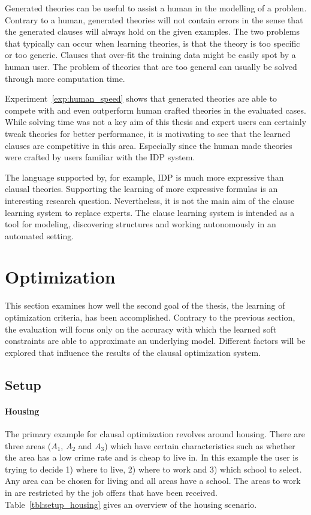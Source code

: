 Generated theories can be useful to assist a human in the modelling of a problem.
Contrary to a human, generated theories will not contain errors in the sense that the generated clauses will always hold on the given examples.
The two problems that typically can occur when learning theories, is that the theory is too specific or too generic.
Clauses that over-fit the training data might be easily spot by a human user.
The problem of theories that are too general can usually be solved through more computation time. 

Experiment~\ref{exp:human_speed} shows that generated theories are able to compete with and even outperform human crafted theories in the evaluated cases.
While solving time was not a key aim of this thesis and expert users can certainly tweak theories for better performance, it is motivating to see that the learned clauses are competitive in this area.
Especially since the human made theories were crafted by users familiar with the IDP system.

The language supported by, for example, IDP is much more expressive than clausal theories.
Supporting the learning of more expressive formulas is an interesting research question.
Nevertheless, it is not the main aim of the clause learning system to replace experts.
The clause learning system is intended as a tool for modeling, discovering structures and working autonomously in an automated setting.

\section{Optimization}
This section examines how well the second goal of the thesis, the learning of optimization criteria, has been accomplished.
Contrary to the previous section, the evaluation will focus only on the accuracy with which the learned soft constraints are able to approximate an underlying model.
Different factors will be explored that influence the results of the clausal optimization system.

\subsection{Setup}

\paragraph{Housing}
The primary example for clausal optimization revolves around housing.
There are three areas ($A_1$, $A_2$ and $A_3$) which have certain characteristics such as whether the area has a low crime rate and is cheap to live in.
In this example the user is trying to decide 1) where to live, 2) where to work and 3) which school to select.
Any area can be chosen for living and all areas have a school.
The areas to work in are restricted by the job offers that have been received.
Table~\ref{tbl:setup_housing} gives an overview of the housing scenario.

